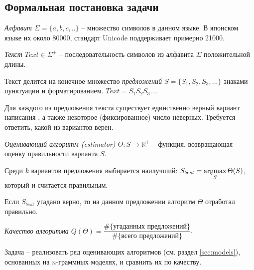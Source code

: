\subsection{ Формальная постановка задачи }

\begin{definition}
	{\textit{Алфавит $\Sigma = \{ a, b, c, .. \}$}} -- множество символов в данном языке. В японском языке их около 80000, стандарт Unicode поддерживает примерно 21000.
\end{definition}

\begin{definition}
	{\textit{Текст $Text \in \Sigma^+$}} -- последовательность символов из алфавита $\Sigma$ положительной длины.
\end{definition}

\begin{definition}
	Текст делится на конечное множество {\textit{предложений $S = \{ S_1, S_2, S_3, ... \}$}} знаками пунктуации и форматированием. $Text = S_1S_2S_3...$.
\end{definition}

Для каждого из предложения текста существует единственно верный вариант написания , а также некоторое (фиксированное) число неверных. Требуется ответить, какой из вариантов верен.

\begin{definition}
	{\textit{Оценивающий алгоритм (estimator) $\Theta : S \rightarrow \mathbb{R}^+ $}} -- функция, возвращающая оценку правильности варианта $S$.
\end{definition}

Среди $k$ вариантов предложения выбирается наилучший: $S_{best} = \operatorname*{argmax}\limits_{S} \Theta(S)$, который и считается правильным.

Если $S_{best}$ угадано верно, то на данном предложении алгоритм $\Theta$ отработал правильно.

\begin{definition}
	{\textit{Качество алгоритма $Q(\Theta) = \dfrac{\#\{ \text{угаданных предложений} \}}{\#\{ \text{всего предложений} \}}$}}.
\end{definition}

Задача -- реализовать ряд оценивающих алгоритмов (см. раздел \ref{sec:models}), основанных на $n$-граммных моделях, и сравнить их по качеству.